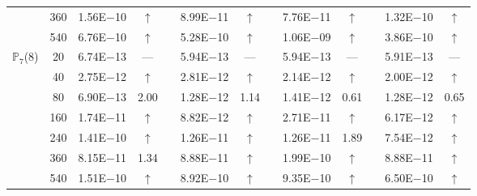 \begin{table}[H]
{\begin{tabular}{@{}l c c c c c c c c c c c c@{}}
 & 360 & 1.56E$-$10 & $\uparrow$  &  & 8.99E$-$11 & $\uparrow$ &  & 7.76E$-$11 & $\uparrow$ &  & 1.32E$-$10 & $\uparrow$\\
 & 540 & 6.76E$-$10 & $\uparrow$  &  & 5.28E$-$10 & $\uparrow$ &  & 1.06E$-$09 & $\uparrow$ &  & 3.86E$-$10 & $\uparrow$\\
\midrule
\multirow{7}{*}{$\mathbb{P}_{7}$(8)}
 & 20 & 6.74E$-$13 & ---  &  & 5.94E$-$13 & --- &  & 5.94E$-$13 & --- &  & 5.91E$-$13 & ---\\
 & 40 & 2.75E$-$12 & $\uparrow$  &  & 2.81E$-$12 & $\uparrow$ &  & 2.14E$-$12 & $\uparrow$ &  & 2.00E$-$12 & $\uparrow$\\
 & 80 & 6.90E$-$13 & 2.00  &  & 1.28E$-$12 & 1.14 &  & 1.41E$-$12 & 0.61 &  & 1.28E$-$12 & 0.65\\
 & 160 & 1.74E$-$11 & $\uparrow$  &  & 8.82E$-$12 & $\uparrow$ &  & 2.71E$-$11 & $\uparrow$ &  & 6.17E$-$12 & $\uparrow$\\
 & 240 & 1.41E$-$10 & $\uparrow$  &  & 1.26E$-$11 & $\uparrow$ &  & 1.26E$-$11 & 1.89 &  & 7.54E$-$12 & $\uparrow$\\
 & 360 & 8.15E$-$11 & 1.34  &  & 8.88E$-$11 & $\uparrow$ &  & 1.99E$-$10 & $\uparrow$ &  & 8.88E$-$11 & $\uparrow$\\
 & 540 & 1.51E$-$10 & $\uparrow$  &  & 8.92E$-$10 & $\uparrow$ &  & 9.35E$-$10 & $\uparrow$ &  & 6.50E$-$10 & $\uparrow$\\
\bottomrule
\end{tabular}}
\label{PRO:bending:01_01_glob3v2}
\end{table}
